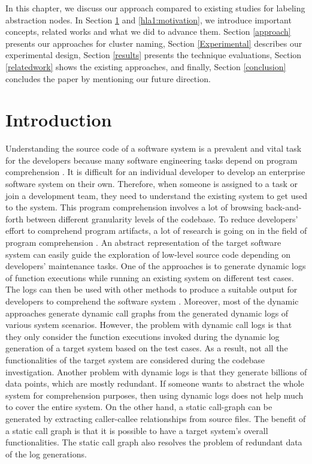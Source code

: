 \label{chapter:hla1}

In this chapter, we discuss our approach compared to existing studies for labeling abstraction nodes. In Section \ref{hla1:intro} and \ref{hla1:motivation}, we introduce important concepts, related works and what we did to advance them. Section \ref{approach} presents our approaches for cluster naming, Section \ref{Experimental} describes our experimental design, 
Section \ref{results} presents the technique evaluations, Section \ref{relatedwork} shows the existing approaches,
and finally, Section \ref{conclusion} concludes the paper by mentioning our future direction.  


\section{Introduction}
\label{hla1:intro}
Understanding the source code of a software system is a prevalent and vital task for the developers because many software engineering tasks depend on program comprehension \cite{cornelissen2009systematic, gilmore1991models, xie2016revisit, feng2018hierarchicalExecutionComprehension}. It is difficult for an individual developer to develop an enterprise software system on their own. Therefore, when someone is assigned to a task or join a development team, they need to understand the existing system to get used to the system. This program comprehension involves a lot of browsing back-and-forth between different granularity levels of the codebase. To reduce developers' effort to comprehend program artifacts, a lot of research is going on in the field of program comprehension \cite{feng2018hierarchicalExecutionComprehension, gharibi2018automaticStaticCluster, kulkarni2014supporting, izu2019program}. An abstract representation of the target software system can easily guide the exploration of low-level source code depending on developers' maintenance tasks. One of the approaches is to generate dynamic logs of function executions while running an existing system on different test cases. The logs can then be used with other methods to produce a suitable output for developers to comprehend the software system \cite{feng2018hierarchicalExecutionComprehension}.
Moreover, most of the dynamic approaches generate dynamic call graphs from the generated dynamic logs of various system scenarios. However, the problem with dynamic call logs is that they only consider the function executions invoked during the dynamic log generation of a target system based on the test cases. As a result, not all the functionalities of the target system are considered during the codebase investigation. Another problem with dynamic logs is that they generate billions of data points, which are mostly redundant. If someone wants to abstract the whole system for comprehension purposes, then using dynamic logs does not help much to cover the entire system.
On the other hand, a static call-graph can be generated by extracting caller-callee relationships from source files. The benefit of a static call graph is that it is possible to have a target system's overall functionalities. The static call graph also resolves the problem of redundant data of the log generations.



